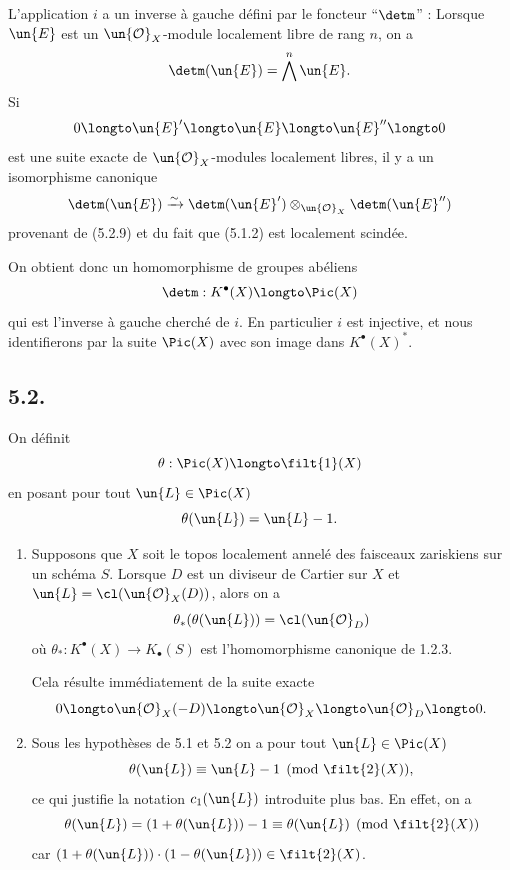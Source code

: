 L'application $i$ a un inverse \`a gauche d\'efini par le foncteur ``$\detm$'' : Lorsque $\un{E}$ est un $\un{\mathcal{O}}_{X}$-module localement libre de rang $n$, on a
\[
\detm(\un{E}) = \bigwedge^{n} \un{E}.
\]
Si
\begin{equation}\label{eq:5.1.2}
0 \longto \un{E}' \longto \un{E} \longto \un{E}'' \longto 0
\end{equation}
est une suite exacte de $\un{\mathcal{O}}_{X}$-modules localement libres, il y a un isomorphisme canonique
\[
\detm(\un{E}) \xrightarrow{\sim} \detm(\un{E}') \otimes_{\un{\mathcal{O}}_{X}} \detm(\un{E}'')
\]
provenant de (5.2.9) et du fait que (5.1.2) est localement scind\'ee.

On obtient donc un homomorphisme de groupes ab\'eliens
\begin{equation}\label{eq:5.1.3}
\detm : K^{\bullet}(X) \longto \Pic(X)
\end{equation}
qui est l'inverse \`a gauche cherch\'e de $i$. En particulier $i$ est injective, et nous identifierons par la suite $\Pic(X)$ avec son image dans $K^{\bullet}(X)^{*}$.

\subsection*{5.2.}

On d\'efinit
\begin{equation}\label{eq:5.2.1}
\theta : \Pic(X) \longto \filt{1}(X)
\end{equation}
en posant pour tout $\un{L} \in \Pic(X)$
\[
\theta(\un{L}) = \un{L} - 1.
\]

\begin{remarques}[5.2.2]
\begin{enumerate}[label=\alph*)]
\item Supposons que $X$ soit le topos localement annel\'e des faisceaux zariskiens sur un sch\'ema $S$. Lorsque $D$ est un diviseur de Cartier sur $X$ et $\un{L} = \cl(\un{\mathcal{O}}_{X}(D))$, alors on a
\begin{equation}\label{eq:5.2.3}
\theta_{*}(\theta(\un{L})) = \cl(\un{\mathcal{O}}_{D})
\end{equation}
o\`u $\theta_{*} : K^{\bullet}(X) \to K_{\bullet}(S)$ est l'homomorphisme canonique de 1.2.3.

Cela r\'esulte imm\'ediatement de la suite exacte
\[
0 \longto \un{\mathcal{O}}_{X}(-D) \longto \un{\mathcal{O}}_{X} \longto \un{\mathcal{O}}_{D} \longto 0.
\]

\item Sous les hypoth\`eses de 5.1 et 5.2 on a pour tout $\un{L} \in \Pic(X)$
\begin{equation}\label{eq:5.2.4}
\theta(\un{L}) \equiv \un{L} - 1 \pmod{\filt{2}(X)},
\end{equation}
ce qui justifie la notation $c_{1}(\un{L})$ introduite plus bas. En effet, on a
\[
\theta(\un{L}) = (1 + \theta(\un{L})) - 1 \equiv \theta(\un{L}) \pmod{\filt{2}(X)}
\]
car $(1 + \theta(\un{L})) \cdot (1 - \theta(\un{L})) \in \filt{2}(X)$.
\end{enumerate}
\end{remarques}

